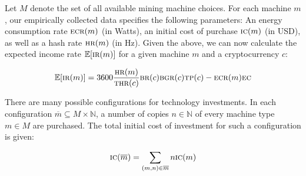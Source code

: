 \begin{table}
  \centering
  \caption{The parameters to our proof-of-work mining simulations. Some depend on the cryptocurrency $c$.}
  \label{tbl:work-constants}
\end{table}


Let $M$ denote the set of all available mining machine choices. For each machine
$m$, our empirically collected data specifies the following parameters: An
energy consumption rate $\textsc{ecr}(m)$ (in Watts), an initial cost of purchase $\textsc{ic}(m)$
(in USD), as well as a hash rate $\textsc{hr}(m)$ (in Hz). Given the above, we can now
calculate the expected income rate $\mathbb{E}[\textsc{ir}(m)]$ for a given machine $m$
and a cryptocurrency $c$:

\[
\mathbb{E}[\textsc{ir}(m)] = 3600 \frac{\textsc{hr}(m)}{\textsc{thr}(c)}\textsc{br}(c)\textsc{bgr}(c)\textsc{tp}(c) - \textsc{ecr}(m) \textsc{ec}
\]

There are many possible configurations for technology investments. In each
configuration $\overline{m} \subseteq M \times \mathbb{N}$, a number of copies
$n \in \mathbb{N}$ of every machine type $m \in M$ are purchased. The total
initial cost of investment for such a configuration is given:

\[
  \textsc{ic}(\overline{m}) = \sum_{(m, n) \in \overline{m}}{n\textsc{ic}(m)}
\]

